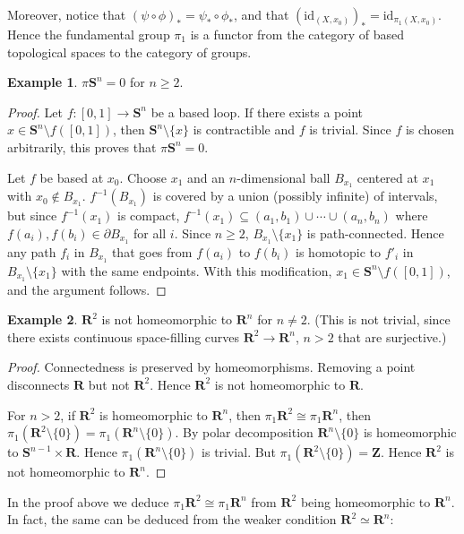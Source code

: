 \documentclass[11pt]{article}
\theoremstyle{definition}
\newtheorem*{example}{Example}
\theoremstyle{plain}
\theoremstyle{remark}
\newcommand{\id}{\textrm{id}}
\newcommand{\R}{\mathbf{R}}
\newcommand{\Z}{\mathbf{Z}}
\begin{document}
Moreover, notice that $(\psi\circ\phi)_\ast=\psi_\ast\circ\phi_\ast$, and that $(\id_{(X,x_0)})_\ast=\id_{\pi_1(X,x_0)}$. Hence the fundamental group $\pi_1$ is a functor from the category of based topological spaces to the category of groups.

\begin{example}
$\pi\mathbf{S}^n=0$ for $n\geq2$.
\begin{proof}
Let $f:[0,1]\to\mathbf{S}^n$ be a based loop. If there exists a point $x\in\mathbf{S}^n\setminus f([0,1])$, then $\mathbf{S}^n\setminus\{x\}$ is contractible and $f$ is trivial. Since $f$ is chosen arbitrarily, this proves that $\pi\mathbf{S}^n=0$.\medbreak

Let $f$ be based at $x_0$. Choose $x_1$ and an $n$-dimensional ball $B_{x_1}$ centered at $x_1$ with $x_0\not\in B_{x_1}$. $f^{-1}(B_{x_1})$ is covered by a union (possibly infinite) of intervals, but since $f^{-1}(x_1)$ is compact, $f^{-1}(x_1)\subseteq(a_1,b_1)\cup\cdots\cup(a_n,b_n)$ where $f(a_i),f(b_i)\in\partial B_{x_1}$ for all $i$. Since $n\geq2$, $B_{x_1}\setminus\{x_1\}$ is path-connected. Hence any path $f_i$ in $B_{x_1}$ that goes from $f(a_i)$ to $f(b_i)$ is homotopic to $f'_i$ in $B_{x_1}\setminus\{x_1\}$ with the same endpoints. With this modification, $x_1\in\mathbf{S}^n\setminus f([0,1])$, and the argument follows.
\end{proof}
\end{example}


\begin{example}
$\R^2$ is not homeomorphic to $\R^n$ for $n\neq2$. (This is not trivial, since there exists continuous space-filling curves $\R^2\to\R^n$, $n>2$ that are surjective.)
\end{example}

\begin{proof}
Connectedness is preserved by homeomorphisms. Removing a point disconnects $\R$ but not $\R^2$. Hence $\R^2$ is not homeomorphic to $\R$.\medbreak

For $n>2$, if $\R^2$ is homeomorphic to $\R^n$, then $\pi_1\R^2\cong\pi_1\R^n$, then $\pi_1(\R^2\setminus\{0\})=\pi_1(\R^n\setminus\{0\})$. By polar decomposition $\R^n\setminus\{0\}$ is homeomorphic to $\mathbf{S}^{n-1}\times\R$. Hence $\pi_1(\R^n\setminus\{0\})$ is trivial. But $\pi_1(\R^2\setminus\{0\})=\Z$. Hence $\R^2$ is not homeomorphic to $\R^n$.
\end{proof}

In the proof above we deduce $\pi_1\R^2\cong\pi_1\R^n$ from $\R^2$ being homeomorphic to $\R^n$. In fact, the same can be deduced from the weaker condition $\R^2\simeq\R^n$:
\end{document}
